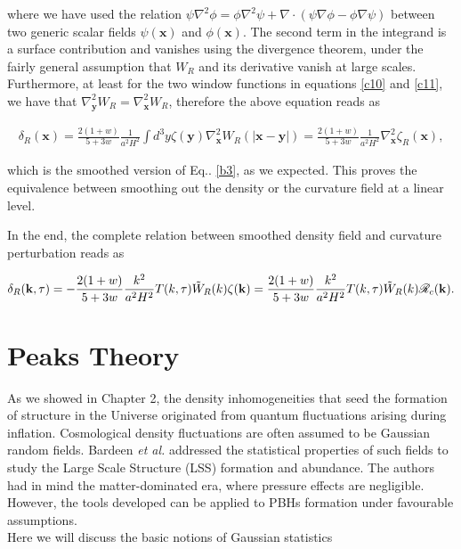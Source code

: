 \begin{appendices}
where we have used the relation $\psi \nabla^{2} \phi=\phi \nabla^{2} \psi+\nabla \cdot(\psi \nabla \phi-\phi \nabla \psi)$ between two generic scalar fields $\psi(\mathbf{x})$ and $\phi(\mathbf{x})$. The second term in the integrand is a surface contribution and vanishes using the divergence theorem, under the fairly general assumption that $W_{R}$ and its derivative vanish at large scales. Furthermore, at least for the two window functions in equations  \ref{c10} and \ref{c11}, we have that $\nabla_{\mathbf{y}}^{2} W_{R}=\nabla_{\mathbf{x}}^{2} W_{R}$, therefore the above equation reads as

\begin{align}
    \delta_{R}(\mathbf{x})=\frac{2(1+w)}{5+3 w} \frac{1}{a^{2} H^{2}} \int d^{3} y \zeta(\mathbf{y}) \nabla_{\mathbf{x}}^{2} W_{R}(|\mathbf{x}-\mathbf{y}|)=\frac{2(1+w)}{5+3 w} \frac{1}{a^{2} H^{2}} \nabla_{\mathbf{x}}^{2} \zeta_{R}(\mathbf{x}),
\end{align}

which is the smoothed version of Eq.. \ref{b3}, as we expected. This proves the equivalence between smoothing out the density or the curvature field at a linear level.

In the end, the complete relation between smoothed density field and curvature perturbation reads as

\begin{align}
    \delta_{R}(\mathbf{k}, \tau)=-\frac{2(1+w)}{5+3 w} \frac{k^{2}}{a^{2} H^{2}} T(k, \tau) \Tilde{W}_{R}(k) \zeta(\mathbf{k}) =  \frac{2(1+w)}{5+3 w} \frac{k^{2}}{a^{2} H^{2}} T(k, \tau) \Tilde{W}_{R}(k)  \mathcal{R}_{c}(\mathbf{k}).
\end{align}




\chapter{Peaks Theory}\label{Peaks}
As we showed in Chapter 2, the density inhomogeneities that seed the formation of structure in the Universe originated from quantum fluctuations arising during inflation. Cosmological density fluctuations are often assumed to be Gaussian random fields. Bardeen \emph{et al.} \cite{1986ApJ...304...15B}addressed the statistical properties of such fields to study the Large Scale Structure (LSS) formation and abundance. The authors had in mind the matter-dominated era, where pressure effects are negligible. However, the tools developed can be applied to PBHs formation under favourable assumptions.\\
Here we will discuss the basic notions of Gaussian statistics 


\end{appendices}
